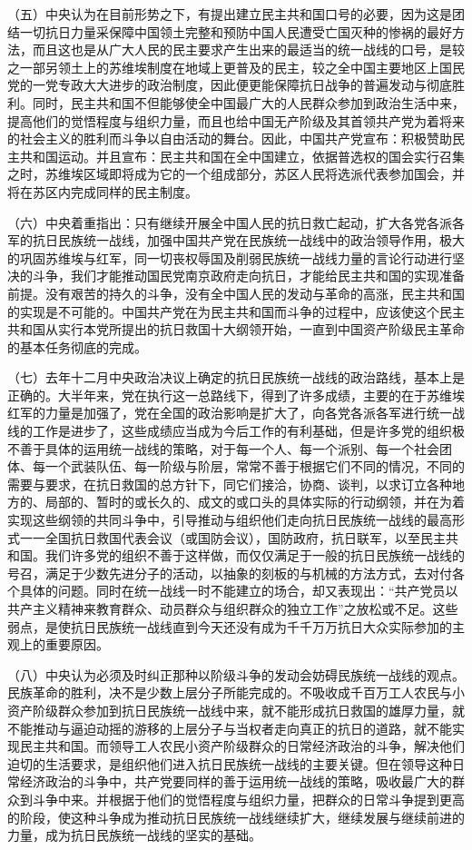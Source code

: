 （五）中央认为在目前形势之下，有提出建立民主共和国口号的必要，因为这是团结一切抗日力量采保障中国领土完整和预防中国人民遭受亡国灭种的惨祸的最好方法，而且这也是从广大人民的民主要求产生出来的最适当的统一战线的口号，是较之一部另领土上的苏维埃制度在地域上更普及的民主，较之全中国主要地区上国民党的一党专政大大进步的政治制度，因此便更能保障抗日战争的普遍发动与彻底胜利。同时，民主共和国不但能够使全中国最广大的人民群众参加到政治生活中来，提高他们的觉悟程度与组织力量，而且也给中国无产阶级及其首领共产党为着将来的社会主义的胜利而斗争以自由活动的舞台。因此，中国共产党宣布：积极赞助民主共和国运动。并且宣布：民主共和国在全中国建立，依据普选权的国会实行召集之时，苏维埃区域即将成为它的一个组成部分，苏区人民将选派代表参加国会，并将在苏区内完成同样的民主制度。

（六）中央着重指出：只有继续开展全中国人民的抗日救亡起动，扩大各党各派各军的抗日民族统一战线，加强中国共产党在民族统一战线中的政治领导作用，极大的巩固苏维埃与红军，同一切丧权辱国及削弱民族统一战线力量的言论行动进行坚决的斗争，我们才能推动国民党南京政府走向抗日，才能给民主共和国的实现准备前提。没有艰苦的持久的斗争，没有全中国人民的发动与革命的高涨，民主共和国的实现是不可能的。中国共产党在为民主共和国而斗争的过程中，应该使这个民主共和国从实行本党所提出的抗日救国十大纲领开始，一直到中国资产阶级民主革命的基本任务彻底的完成。

（七）去年十二月中央政治决议上确定的抗日民族统一战线的政治路线，基本上是正确的。大半年来，党在执行这一总路线下，得到了许多成绩，主要的在于苏维埃红军的力量是加强了，党在全国的政治影响是扩大了，向各党各派各军进行统一战线的工作是进步了，这些成绩应当成为今后工作的有利基础，但是许多党的组织极不善于具体的运用统一战线的策略，对于每一个人、每一个派别、每一个社会团体、每一个武装队伍、每一阶级与阶层，常常不善于根据它们不同的情况，不同的需要与要求，在抗日救国的总方针下，同它们接洽，协商、谈判，以求订立各种地方的、局部的、暂时的或长久的、成文的或口头的具体实际的行动纲领，并在为着实现这些纲领的共同斗争中，引导推动与组织他们走向抗日民族统一战线的最高形式一一全国抗日救国代表会议（或国防会议），国防政府，抗日联军，以至民主共和国。我们许多党的组织不善于这样做，而仅仅满足于一般的抗日民族统一战线的号召，满足于少数先进分子的活动，以抽象的刻板的与机械的方法方式，去对付各个具体的问题。同时在统一战线一时不能建立的场合，却又表现出：“共产党员以共产主义精神来教育群众、动员群众与组织群众的独立工作”之放松或不足。这些弱点，是使抗日民族统一战线直到今天还没有成为千千万万抗日大众实际参加的主观上的重要原因。

（八）中央认为必须及时纠正那种以阶级斗争的发动会妨碍民族统一战线的观点。民族革命的胜利，决不是少数上层分子所能完成的。不吸收成千百万工人农民与小资产阶级群众参加到抗日民族统一战线中来，就不能形成抗日救国的雄厚力量，就不能推动与逼迫动摇的游移的上层分子与当权者走向真正的抗日的道路，就不能实现民主共和国。而领导工人农民小资产阶级群众的日常经济政治的斗争，解决他们迫切的生活要求，是组织他们进入抗日民族统一战线的主要关键。但在领导这种日常经济政治的斗争中，共产党要同样的善于运用统一战线的策略，吸收最广大的群众到斗争中来。并根据于他们的觉悟程度与组织力量，把群众的日常斗争提到更高的阶段，使这种斗争成为推动抗日民族统一战线继续扩大，继续发展与继续前进的力量，成为抗日民族统一战线的坚实的基础。

